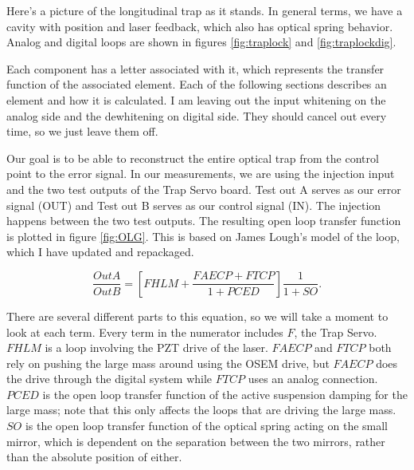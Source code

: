 Here's a picture of the longitudinal trap as it stands.  In general terms, we have a cavity with position and laser feedback, which also has optical spring behavior.  Analog and digital loops are shown in figures \ref{fig:traplock} and \ref{fig:traplockdig}.



Each component has a letter associated with it, which represents the transfer function of the associated element. Each of the following sections describes an element and how it is calculated.
I am leaving out the input whitening on the analog side and the dewhitening on digital side.  They should cancel out every time, so we just leave them off.

Our goal is to be able to reconstruct the entire optical trap from the control point to the error signal.  In our measurements, we are using the injection input and the two test outputs of the Trap Servo board. Test out A serves as our error signal (OUT) and Test out B serves as our control signal (IN).  The injection happens between the two test outputs. The resulting open loop transfer function is plotted in figure \ref{fig:OLG}.
This is based on James Lough's  \cite{LoughThesis} model of the loop, which I have updated and repackaged.


\begin{equation}
\frac{Out A}{Out B}=\left[FHLM+\frac{FAECP+FTCP}{1+PCED}\right]\frac{1}{1+SO}.
\label{eq:loop}
\end{equation}

There are several different parts to this equation, so we will take a moment to look at each term.  Every term in the numerator includes $F$, the Trap Servo. $FHLM$ is a loop involving the PZT drive of the laser.  $FAECP$ and $FTCP$ both rely on pushing the large mass around using the OSEM drive, but $FAECP$ does the drive through the digital system while $FTCP$ uses an analog connection. $PCED$ is the open loop transfer function of the active suspension damping for the large mass; note that this only affects the loops that are driving the large mass. $SO$ is the open loop transfer function of the optical spring acting on the small mirror, which is dependent on the separation between the two mirrors, rather than the absolute position of either.



